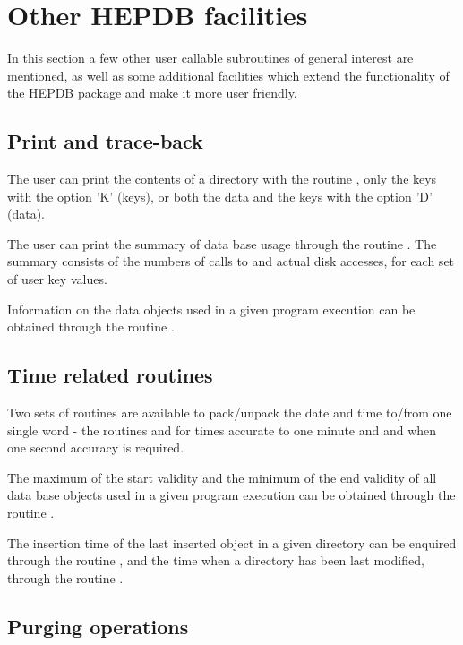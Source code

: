 \section{Other HEPDB facilities}

In this section a few other user callable subroutines of general
interest are mentioned, as well as some additional facilities which
extend the functionality of the HEPDB package and make it more user
friendly.

\subsection{Print and trace-back}

The user can print the contents of a directory with the routine
, only the keys with the option 'K' (keys), or both the data and
the keys with the option 'D' (data).

The user can print the summary of data base usage through the routine
. The summary consists of the numbers of calls to  and actual
disk accesses, for each set of user key values.

Information on the data objects used in a given program execution can
be obtained through the routine .

\subsection{Time related routines}

Two sets of routines are available to pack/unpack the date and time
to/from one single word - the routines  and 
for times accurate to one minute and
 and  when one second accuracy is required.

The maximum of the start validity and the minimum of the end validity
of all data base objects used in a given program execution can be
obtained through the routine .

The insertion time of the last inserted object in a given directory
can be enquired through the routine , and the time when a
directory has been last modified, through the routine .

\subsection{Purging operations}

